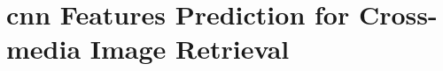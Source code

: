 
\graphicspath{{img/t2v/}}

\chapter{\gls{cnn} Features Prediction for Cross-media Image Retrieval}
\label{ch:text2vis}

